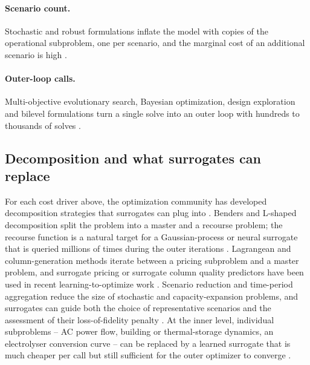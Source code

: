 \paragraph{Scenario count.}
Stochastic and robust formulations inflate the model with copies of
the operational subproblem, one per scenario, and the marginal cost
of an additional scenario is high
\cite{Wang20211767,Safta20172535,Hu2021671,Hu2020,Volodina2022,Lawson201647,Liang20246508,Lin2023}.

\paragraph{Outer-loop calls.}
Multi-objective evolutionary search, Bayesian optimization, design
exploration and bilevel formulations turn a single solve into an
outer loop with hundreds to thousands of solves
\cite{Thrampoulidis2021,Hussien20211883,Wang2017,Schulte2020,Han2018622,Roth2019214,Giorgetti2020,Hirvonen2017323,Pang2023,Xiao2018}.


\subsection{Decomposition and what surrogates can replace}
\label{sec:background:decomposition}

For each cost driver above, the optimization community has developed
decomposition strategies that surrogates can plug into
\cite{Ruan2021221,Khaloie2025,Lim2025,Wu2022231,Chen2022,Chen20244723,Liu20223726}.
Benders and L-shaped decomposition split the problem into a master
and a recourse problem; the recourse function is a natural target for
a Gaussian-process or neural surrogate that is queried millions of
times during the outer iterations
\cite{Hu2021671,Hu2020,Volodina2022,Lawson201647,Safta20172535,Liang20246508}.
Lagrangean and column-generation methods iterate between a pricing
subproblem and a master problem, and surrogate pricing or surrogate
column quality predictors have been used in recent
learning-to-optimize work
\cite{Chen20244723,Chen2022,Wu2022231,Guo20222057,Xu20223066,Li202359995}.
Scenario reduction and time-period aggregation reduce the size of
stochastic and capacity-expansion problems, and surrogates can guide
both the choice of representative scenarios and the assessment of
their loss-of-fidelity penalty
\cite{Hu2020,Volodina2022,Lin2023,Pang2023,Yang2024,Dong2023,Liang20246508,Fu20202904,Fu2022}.
At the inner level, individual subproblems -- AC power flow, building
or thermal-storage dynamics, an electrolyser conversion curve -- can
be replaced by a learned surrogate that is much cheaper per call but
still sufficient for the outer optimizer to converge
\cite{Su2022315,Deng2020831,Liu20223726,Chen2023657,Koirala20242284,Xu20212696,Park2019,Thrampoulidis2021,Han2018622,Wang2021,Roth2019214,Hirvonen2017323,Reynolds2017704}.

